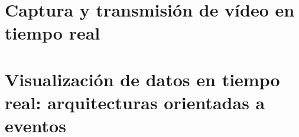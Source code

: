 \section{Captura y transmisión de vídeo en tiempo real}


\section{Visualización de datos en tiempo real: arquitecturas orientadas a eventos}
